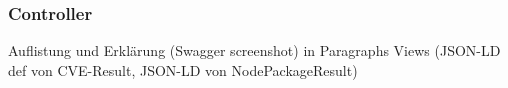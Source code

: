 \subsubsection{Controller} \label{subsubsec:Controller}
    Auflistung und Erklärung (Swagger screenshot) in Paragraphs
    Views (JSON-LD def von \ac{CVE}-Result, JSON-LD von NodePackageResult)